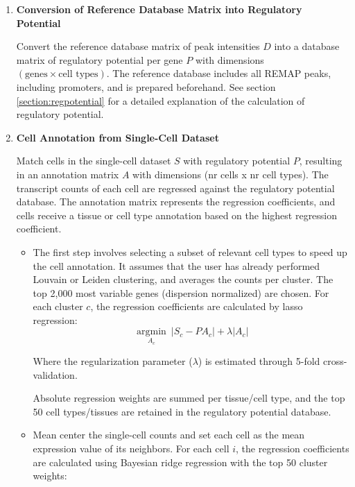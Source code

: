 \begin{enumerate}
    \item \textbf{Conversion of Reference Database Matrix into Regulatory Potential}
    
    Convert the reference database matrix of peak intensities $D$ into a database matrix of regulatory potential\cite{Wang2016} per gene $P$ with dimensions $(\text{genes} \times \text{cell types})$. The reference database includes all REMAP peaks, including promoters, and is prepared beforehand. See section \ref{section:regpotential} for a detailed explanation of the calculation of regulatory potential.

    \item \textbf{Cell Annotation from Single-Cell Dataset}
    
    Match cells in the single-cell dataset $S$ with regulatory potential $P$, resulting in an annotation matrix $A$ with dimensions (nr cells x nr cell types). The transcript counts of each cell are regressed against the regulatory potential database. The annotation matrix represents the regression coefficients, and cells receive a tissue or cell type annotation based on the highest regression coefficient.
    
    \begin{itemize}
        \item The first step involves selecting a subset of relevant cell types to speed up the cell annotation. It assumes that the user has already performed Louvain or Leiden clustering, and averages the counts per cluster. The top 2,000 most variable genes (dispersion normalized) are chosen. For each cluster $c$, the regression coefficients are calculated by lasso regression:
        \begin{equation*}
            \underset{A_c}{\operatorname{argmin}}\ |S_c - P A_c| + \lambda |A_c|
        \end{equation*}

        Where the regularization parameter ($\lambda$) is estimated through 5-fold cross-validation.

        Absolute regression weights are summed per tissue/cell type, and the top 50 cell types/tissues are retained in the regulatory potential database.
        
        \item Mean center the single-cell counts and set each cell as the mean expression value of its neighbors. For each cell $i$, the regression coefficients are calculated using Bayesian ridge regression with the top 50 cluster weights:


\end{itemize}
\end{enumerate}

